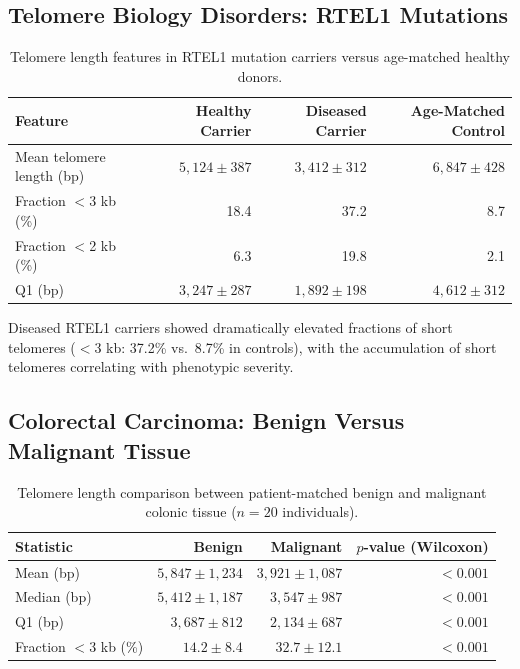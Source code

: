 \documentclass[11pt]{article}
\begin{document}
\subsection{Telomere Biology Disorders: RTEL1 Mutations}

\begin{table}[H]
\centering
\caption{Telomere length features in RTEL1 mutation carriers versus age-matched healthy donors.}
\label{tab:rtel1}
\begin{tabular}{lrrr}
\toprule
\textbf{Feature} & \textbf{Healthy Carrier} & \textbf{Diseased Carrier} & \textbf{Age-Matched Control} \\
\midrule
Mean telomere length (bp) & $5,124 \pm 387$ & $3,412 \pm 312$ & $6,847 \pm 428$ \\
Fraction $<$3 kb (\%) & 18.4 & 37.2 & 8.7 \\
Fraction $<$2 kb (\%) & 6.3 & 19.8 & 2.1 \\
Q1 (bp) & $3,247 \pm 287$ & $1,892 \pm 198$ & $4,612 \pm 312$ \\
\bottomrule
\end{tabular}
\end{table}

Diseased RTEL1 carriers showed dramatically elevated fractions of short telomeres ($<$3 kb: 37.2\% vs.\ 8.7\% in controls), with the accumulation of short telomeres correlating with phenotypic severity.

\subsection{Colorectal Carcinoma: Benign Versus Malignant Tissue}

\begin{table}[H]
\centering
\caption{Telomere length comparison between patient-matched benign and malignant colonic tissue ($n = 20$ individuals).}
\label{tab:crc}
\begin{tabular}{lrrr}
\toprule
\textbf{Statistic} & \textbf{Benign} & \textbf{Malignant} & \textbf{$p$-value (Wilcoxon)} \\
\midrule
Mean (bp) & $5,847 \pm 1,234$ & $3,921 \pm 1,087$ & $<0.001$ \\
Median (bp) & $5,412 \pm 1,187$ & $3,547 \pm 987$ & $<0.001$ \\
Q1 (bp) & $3,687 \pm 812$ & $2,134 \pm 687$ & $<0.001$ \\
Fraction $<$3 kb (\%) & $14.2 \pm 8.4$ & $32.7 \pm 12.1$ & $<0.001$ \\
\bottomrule
\end{tabular}
\end{table}
\end{document}
